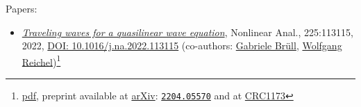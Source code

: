 \noindent Papers:
\begin{itemize}
  \item \textsl{\href{https://www.sciencedirect.com/science/article/pii/S0362546X22001973}{Traveling waves for a quasilinear wave equation}}, Nonlinear Anal., 225:113115, 2022, \href{https://doi.org/10.1016/j.na.2022.113115}{DOI: 10.1016/j.na.2022.113115} (co-authors: \href{https://gabrielebruell.wordpress.com/}{Gabriele Brüll}, \href{\urlReichel}{Wolfgang Reichel})\footnote{\href{https://www.sciencedirect.com/science/article/pii/S0362546X22001973/pdfft?md5=a93dd8c981c232effbdb410267915c3f&pid=1-s2.0-S0362546X22001973-main.pdf}{pdf}, preprint available at \href{https://arxiv.org/abs/2204.05570}{arXiv}: \href{https://arxiv.org/pdf/2204.05570.pdf}{\texttt{2204.05570}} and at \href{https://www.waves.kit.edu/downloads/CRC1173_Preprint_2022-22.pdf}{CRC1173}}
\end{itemize}

